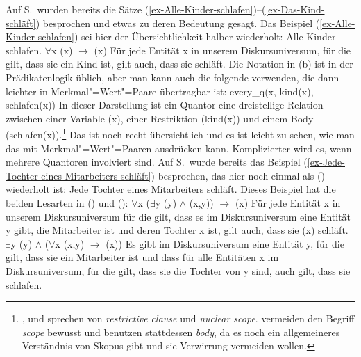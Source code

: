 Auf S.\,\pageref{ex-Alle-Kinder-schlafen} wurden bereits die Sätze
(\ref{ex-Alle-Kinder-schlafen})--(\ref{ex-Das-Kind-schläft}) besprochen und etwas zu deren Bedeutung
gesagt. Das Beispiel (\ref{ex-Alle-Kinder-schlafen}) sei hier der Übersichtlichkeit halber wiederholt:
\eal
\label{ex-Alle-Kinder-schlafen-zwei}
\ex Alle Kinder schlafen.
\ex $\forall$x (x) $\to$ (x)
\ex Für jede Entität x in unserem Diskursuniversum, für die gilt, dass sie ein Kind ist, gilt auch,
dass sie schläft.
\zl
Die Notation in (b) ist in der Prädikatenlogik üblich, aber man kann auch die folgende verwenden, die
dann leichter in Merkmal"=Wert"=Paare übertragbar ist:
\ea
\label{ex-every-kind-schlafen}
every\_q(x, kind(x), schlafen(x))
\z
In dieser Darstellung ist ein Quantor eine dreistellige Relation zwischen einer Variable (x),
einer Restriktion (kind(x)) und einem Body (schlafen(x)).\footnote{%
  \citet[89--90]{Heim2011a-u}, \citet[7]{Diesing92a} und \citet[130]{Kratzer95a} sprechen von
  \emph{restrictive clause} und \emph{nuclear scope}. \citet[287]{mrs} vermeiden den Begriff \emph{scope}
  bewusst und benutzen stattdessen \emph{body}, da es noch ein allgemeineres Verständnis von Skopus
  gibt und sie Verwirrung vermeiden wollen.%
} Das ist noch recht übersichtlich und es
ist leicht zu sehen, wie man das mit Merkmal"=Wert"=Paaren ausdrücken kann. Komplizierter wird es,
wenn mehrere Quantoren involviert sind. Auf S.\,\pageref{ex-Jede-Tochter-eines-Mitarbeiters-schläft} wurde bereits das Beispiel
(\ref{ex-Jede-Tochter-eines-Mitarbeiters-schläft}) besprochen, das hier noch einmal als ()
wiederholt ist:
\ea
\label{ex-Jede-Tochter-eines-Mitarbeiters-schläft-zwei}
Jede Tochter eines Mitarbeiters schläft.
\z
{}
Dieses Beispiel hat die beiden Lesarten in () und ():
\eal
\label{ex-Jede Tochter eines Mitarbeiters schläft. weiter Skopus Allquantor}
\ex $\forall$x ($\exists$y (y) $\wedge$ (x,y)) $\to$
(x)
\ex Für jede Entität x in unserem Diskursuniversum für die gilt, dass es im Diskursuniversum eine Entität y gibt, die
Mitarbeiter ist und deren Tochter x ist, gilt auch, dass sie (x) schläft.
\zl
\eal
\label{ex-Jede Tochter eines Mitarbeiters schläft. weiter Skopus Existenzquantor}
\ex $\exists$y (y) $\wedge$ ($\forall$x (x,y) $\to$
(x))
\ex Es gibt im Diskursuniversum eine Entität y, für die gilt, dass sie ein Mitarbeiter ist und dass für alle Entitäten
x im Diskursuniversum, für die gilt, dass sie die Tochter von y sind, auch gilt, dass sie schlafen.
\zl

